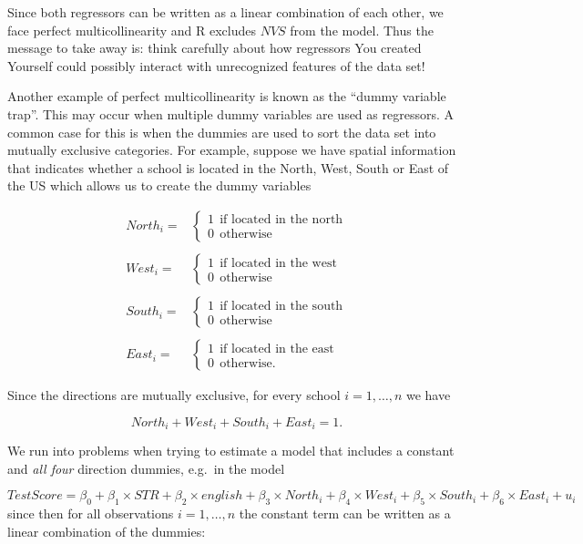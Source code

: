 \documentclass[]{book}
\theoremstyle{definition}
\theoremstyle{definition}
\theoremstyle{definition}
\theoremstyle{remark}
\begin{document}
Since both regressors can be written as a linear combination of each
other, we face perfect multicollinearity and R excludes \(NVS\) from the
model. Thus the message to take away is: think carefully about how
regressors You created Yourself could possibly interact with
unrecognized features of the data set!

Another example of perfect multicollinearity is known as the ``dummy
variable trap''. This may occur when multiple dummy variables are used
as regressors. A common case for this is when the dummies are used to
sort the data set into mutually exclusive categories. For example,
suppose we have spatial information that indicates whether a school is
located in the North, West, South or East of the US which allows us to
create the dummy variables

\begin{align}
  North_i =& 
  \begin{cases}
    1 \ \ \text{if located in the north} \\
    0 \ \ \text{otherwise}
  \end{cases} \\
  \\
    West_i =& 
  \begin{cases}
    1 \ \ \text{if located in the west} \\
    0 \ \ \text{otherwise}
  \end{cases} \\
  \\
    South_i =& 
  \begin{cases}
    1 \ \ \text{if located in the south} \\
    0 \ \ \text{otherwise}
  \end{cases} \\
    \\
    East_i =& 
  \begin{cases}
    1 \ \ \text{if located in the east} \\
    0 \ \ \text{otherwise}.
  \end{cases}
\end{align}

Since the directions are mutually exclusive, for every school
\(i=1,\dots,n\) we have

\[ North_i + West_i + South_i + East_i = 1. \]

We run into problems when trying to estimate a model that includes a
constant and \emph{all four} direction dummies, e.g.~in the model

\[ TestScore = \beta_0 + \beta_1 \times STR + \beta_2 \times english + \beta_3 \times North_i + \beta_4 \times West_i + \beta_5 \times South_i + \beta_6 \times East_i + u_i \tag{6.8}\]
since then for all observations \(i=1,\dots,n\) the constant term can be
written as a linear combination of the dummies:
\end{document}
